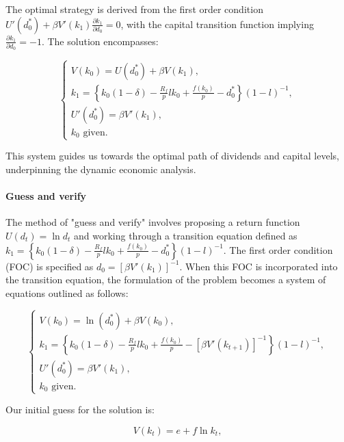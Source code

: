 \documentclass[12pt]{article}
\begin{document}
The optimal strategy is derived from the first order condition \(U'(d_0^*) + \beta V'(k_1) \frac{\partial k_1}{\partial d_0} = 0\), with  the  capital transition function implying \(\frac{\partial k_1}{\partial d_0} = -1\). The solution
encompasses:


\begin{equation}
    \begin{cases}
        V(k_0) = U(d_0^*) + \beta V(k_1), \\
        k_1 = \left\{k_0(1 - \delta) - \frac{R_f}{p} l k_0 + \frac{f(k_0)}{p} - d_0^*\right\}(1-l)^{-1}, \\
        U'(d_0^*) = \beta V'(k_1), \\
        k_0 \text{ given.}
    \end{cases}
\end{equation}


This system guides us towards the optimal path of dividends and capital levels, underpinning the dynamic economic analysis.

\paragraph{Guess and verify}
The method of "guess and verify" involves proposing a return function \(U(d_t) = \ln{d_t}\) and working through a
transition equation defined as \(k_1 = \left\{k_0(1 - \delta) - \frac{R_f}{p} l k_0 + \frac{f(k_0)}{p} -
d^*_0\right\}{(1-l)}^{-1}\). The first order condition (FOC) is specified as \(d_0 = [\beta V'(k_{1})]^{-1}\). When this
FOC is incorporated into the transition equation, the formulation of the problem becomes a system of equations outlined
as follows:


\begin{equation}
    \begin{cases}
        V(k_0) = \ln(d_0^*) + \beta V(k_0), \\
        k_1 = \left\{k_0(1 - \delta) - \frac{R_f}{p} l k_0 + \frac{f(k_0)}{p} - [\beta V'(k_{t+1})]^{-1} \right\}{(1-l)}^{-1}, \\
        U'(d_0^*) = \beta V'(k_1), \\
        k_0 \text{ given.}
    \end{cases}
\end{equation}


Our initial guess for the solution is:


\begin{equation}
    V(k_t) = e + f \ln{k_t},
\end{equation}
\end{document}
